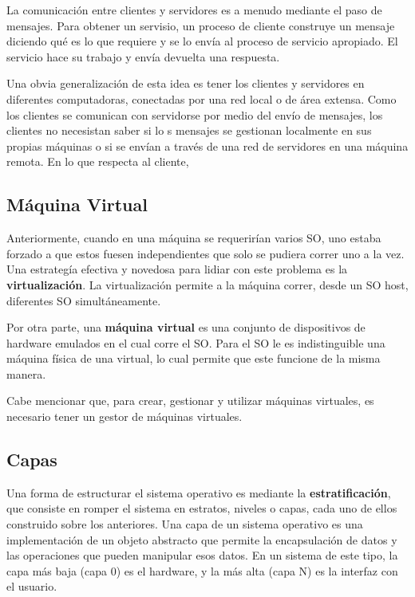 \documentclass[12pt, a4paper]{article} %
\begin{document}
La comunicación entre clientes y servidores es a menudo mediante el paso de mensajes. Para obtener un servisio, un proceso de cliente construye un mensaje diciendo qué es lo que requiere y se lo envía al proceso de servicio apropiado. El servicio hace su trabajo y envía devuelta una respuesta.

Una obvia generalización de esta idea es tener los clientes y servidores en diferentes computadoras, conectadas por una red local o de área extensa. Como los clientes se comunican con servidorse por medio del envío de mensajes, los clientes no necesistan saber si lo s mensajes se gestionan localmente en sus propias máquinas o si se envían a través de una red de servidores en una máquina remota. En lo que respecta al cliente,

\subsection{Máquina Virtual}

Anteriormente, cuando en una máquina se requerirían varios SO, uno estaba forzado a que estos fuesen independientes que solo se pudiera correr uno a la vez. Una estrategía efectiva y novedosa para lidiar con este problema es la \textbf{virtualización}. La virtualización permite a la máquina correr, desde un SO host, diferentes SO simultáneamente.

Por otra parte, una \textbf{máquina virtual} es una conjunto de dispositivos de hardware emulados en el cual corre el SO. Para el SO le es indistinguible una máquina física de una virtual, lo cual permite que este funcione de la misma manera.

Cabe mencionar que, para crear, gestionar y utilizar máquinas virtuales, es necesario tener un gestor de máquinas virtuales.

\subsection{Capas}

Una forma de estructurar el sistema operativo es mediante la \textbf{estratificación}, que consiste en romper el sistema en estratos, niveles o capas, cada uno de ellos construido sobre los anteriores. Una capa de un sistema operativo es una implementación de un objeto abstracto que permite la encapsulación de datos y las operaciones que pueden manipular esos datos. En un sistema de este tipo, la capa más baja (capa 0) es el hardware, y la más alta (capa N) es la interfaz con el usuario.
\end{document}
